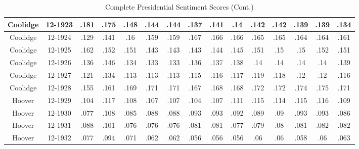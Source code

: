 \begin{sidewaystable}
\begin{singlespace}
\begin{center}
\begin{tabular}{||c c c c c c c c c c c c c c c||}
\hline
Coolidge & 12-1923 & .181 & .175 & .148 & .144 & .144 & .137 & .141 & .14 & .142 & .142 & .139 & .139 & .134 \\ 
\hline
Coolidge & 12-1924 & .129 & .141 & .16 & .159 & .159 & .167 & .166 & .166 & .165 & .165 & .164 & .164 & .161 \\ 
\hline
Coolidge & 12-1925 & .162 & .152 & .151 & .143 & .143 & .143 & .144 & .145 & .151 & .15 & .15 & .152 & .151 \\ 
\hline
Coolidge & 12-1926 & .136 & .146 & .134 & .133 & .133 & .136 & .137 & .138 & .14 & .14 & .14 & .14 & .139 \\ 
\hline
Coolidge & 12-1927 & .121 & .134 & .113 & .113 & .113 & .115 & .116 & .117 & .119 & .118 & .12 & .12 & .116 \\ 
\hline
Coolidge & 12-1928 & .155 & .161 & .169 & .171 & .171 & .167 & .168 & .168 & .172 & .172 & .174 & .175 & .171 \\ 
\hline
Hoover & 12-1929 & .104 & .117 & .108 & .107 & .107 & .104 & .107 & .111 & .115 & .114 & .115 & .116 & .109 \\ 
\hline
Hoover & 12-1930 & .077 & .108 & .085 & .088 & .088 & .093 & .093 & .092 & .089 & .09 & .093 & .093 & .086 \\ 
\hline
Hoover & 12-1931 & .088 & .101 & .076 & .076 & .076 & .081 & .081 & .077 & .079 & .08 & .081 & .082 & .082 \\ 
\hline
Hoover & 12-1932 & .077 & .094 & .071 & .062 & .062 & .056 & .056 & .056 & .06 & .06 & .058 & .06 & .063 \\ 
\hline
 \hline
 \end{tabular}
\end{center}
\caption{Complete Presidential Sentiment Scores (Cont.)}
\label{appendix:sent6}
\end{singlespace}
\end{sidewaystable}

